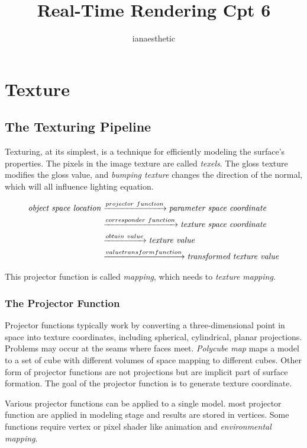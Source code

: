 \documentclass[10pt, a4paper]{article}
\title{Real-Time Rendering Cpt 6}
\author{ianaesthetic}
\begin{document}
\maketitle

\newpage 
\section{Texture}
\subsection{The Texturing Pipeline}
    Texturing, at its simplest, is a technique for efficiently modeling the surface's properties. The pixels in the image texture are called \emph{texels}. The gloss texture modifies the gloss value, and \emph{bumping texture} changes the direction of the normal, which will all influence lighting equation.
    
    \begin{align*}
        \text{\emph{{object space location}}} 
        &\xrightarrow{projector\ function} \emph{parameter space coordinate}\\
        &\xrightarrow{corresponder\ function} \emph{texture space coordinate} \\
        &\xrightarrow{obtain\ value} \emph{texture value}\\
        &\xrightarrow{value transform function} \emph{transformed  texture value}
    \end{align*}

    This projector function is called \emph{mapping}, which needs to \emph{texture mapping}.

    \subsubsection{The Projector Function}
        Projector functions typically work by converting a three-dimensional point in space into texture coordinates, including spherical, cylindrical, planar projections. Problems may occur at the seams where faces meet. \emph{Polycube map} maps a model to a set of cube with different volumes of space mapping to different cubes. Other form of projector functions are not projections but are implicit part of surface formation. The goal of the projector function is to generate texture coordinate. 

        Various projector functions can be applied to a single model. most projector function are applied in modeling stage and results are stored in vertices. Some functions require vertex or pixel shader like animation and \emph{environmental mapping}.
\end{document}
